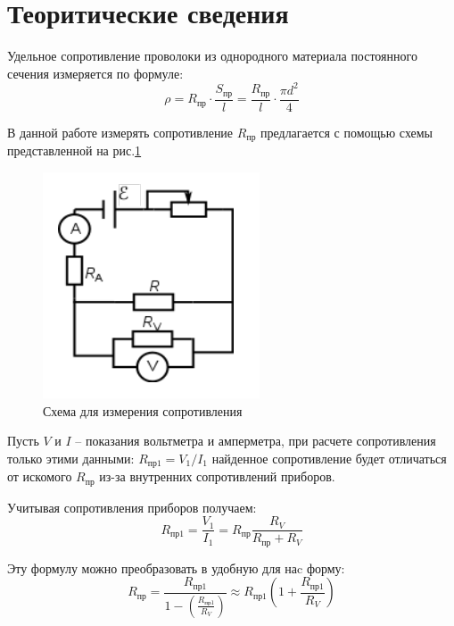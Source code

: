 \documentclass[a4paper, 12pt]{article}
\begin{document}
\section{Теоритические сведения}
\begin{center}{Удельное сопротивление проволоки из однородного материала постоянного сечения измеряется по формуле:}
	\begin{equation}\label{r1}
		\rho = R_\text{пр}\cdot\frac{S_\text{пр}}{l} = \frac{R_\text{пр}}{l} \cdot \frac{\pi d^2}{4}
	\end{equation}
\end{center}
В данной работе измерять сопротивление $R_\text{пр}$ предлагается с помощью  схемы представленной на рис.\ref{sexes}

\begin{figure}[h]
	\centering
	\includegraphics[scale=1.5]{"schema111.png"}
	\caption{Схема для измерения сопротивления}
	\label{sexes}
\end{figure}

Пусть $V$ и $I$ -- показания вольтметра и амперметра, при расчете сопротивления только этими данными: $R_\text{пр1} = V_\text{1}/I_\text{1}$ найденное сопротивление будет отличаться от искомого $R_\text{пр}$ из-за внутренних сопротивлений приборов.

\begin{center}{Учитывая сопротивления приборов получаем:}
	\begin{equation}\label{r1}
		R_\text{пр1} = \frac{V_1}{I_1} = R_\text{пр}\frac{R_V}{R_\text{пр} + R_V}
	\end{equation}
\end{center}

\begin{center}
	Эту формулу можно преобразовать в удобную для наc форму:
	\begin{equation}\label{r3}
		R_\text{пр} = \frac{R_\text{пр1}}{1 - \left(\frac{R_\text{пр1}}{R_V} 	\right)} \approx R_\text{пр1}\left(1 + \frac{R_\text{пр1}}{R_V} \right)
	\end{equation}
\end{center}
\end{document}
